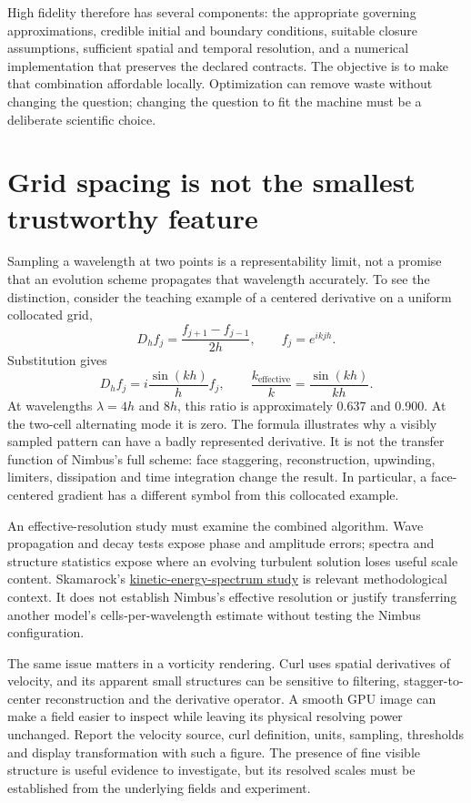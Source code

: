 High fidelity therefore has several components: the appropriate governing
approximations, credible initial and boundary conditions, suitable closure
assumptions, sufficient spatial and temporal resolution, and a numerical
implementation that preserves the declared contracts. The objective is to
make that combination affordable locally. Optimization can remove waste
without changing the question; changing the question to fit the machine must
be a deliberate scientific choice.

\section{Grid spacing is not the smallest trustworthy feature}

Sampling a wavelength at two points is a representability limit, not a promise
that an evolution scheme propagates that wavelength accurately. To see the
distinction, consider the teaching example of a centered derivative on a
uniform collocated grid,
\[
 D_h f_j=\frac{f_{j+1}-f_{j-1}}{2h},\qquad f_j=e^{ikjh}.
\]
Substitution gives
\[
 D_h f_j=i\frac{\sin(kh)}{h}f_j,
 \qquad \frac{k_{\mathrm{effective}}}{k}
       =\frac{\sin(kh)}{kh}.
\]
At wavelengths $\lambda=4h$ and $8h$, this ratio is approximately 0.637 and
0.900. At the two-cell alternating mode it is zero. The formula illustrates
why a visibly sampled pattern can have a badly represented derivative. It is
not the transfer function of Nimbus's full scheme: face staggering,
reconstruction, upwinding, limiters, dissipation and time integration change
the result. In particular, a face-centered gradient has a different symbol
from this collocated example.

An effective-resolution study must examine the combined algorithm. Wave
propagation and decay tests expose phase and amplitude errors; spectra and
structure statistics expose where an evolving turbulent solution loses useful
scale content. Skamarock's
\href{https://doi.org/10.1175/MWR2830.1}{kinetic-energy-spectrum study}
is relevant methodological context. It does not establish Nimbus's effective
resolution or justify transferring another model's cells-per-wavelength
estimate without testing the Nimbus configuration.

The same issue matters in a vorticity rendering. Curl uses spatial derivatives
of velocity, and its apparent small structures can be sensitive to filtering,
stagger-to-center reconstruction and the derivative operator. A smooth GPU
image can make a field easier to inspect while leaving its physical resolving
power unchanged. Report the velocity source, curl definition, units,
sampling, thresholds and display transformation with such a figure. The
presence of fine visible structure is useful evidence to investigate, but its
resolved scales must be established from the underlying fields and experiment.

